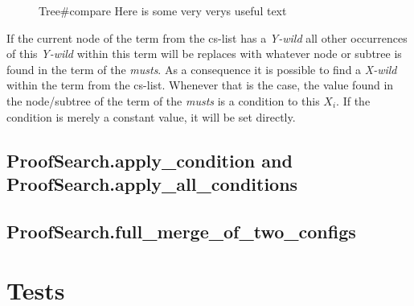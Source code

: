 \begin{figure}[H]
	\vspace{-10pt}
	
	\vspace{-10pt}
\end{figure}
\begin{figure}[H]
	\vspace{-10pt}
	
	\vspace{-10pt}
	\caption{Tree\#compare Here is some very verys useful text}
	\vspace{-10pt}
\end{figure}

If the current node of the term from the cs-list has a \emph{Y-wild} all other occurrences of this \emph{Y-wild} within this term will be replaces with whatever node or subtree is found in the term of the \emph{musts}. As a consequence it is possible to find a \emph{X-wild} within the term from the cs-list. Whenever that is the case, the value found in the node/subtree of the term of the \emph{musts} is a condition to this $X_i$. If the condition is merely a constant value, it will be set directly.

\subsection{ProofSearch.apply\_condition and ProofSearch.apply\_all\_conditions}
\subsection{ProofSearch.full\_merge\_of\_two\_configs}

\section{Tests}

